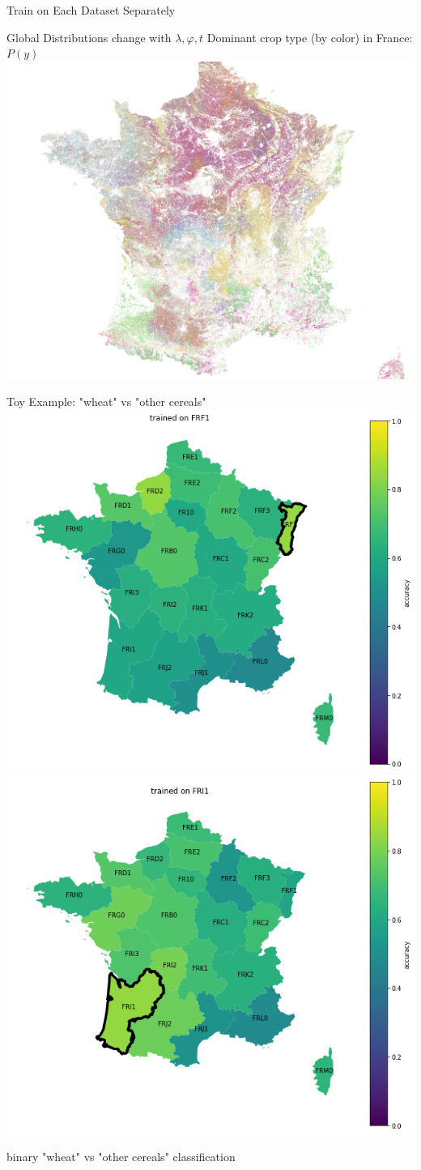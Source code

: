 \documentclass[11pt]{beamer}
\begin{document}
	\begin{frame}{Train on Each Dataset Separately}
		
	\end{frame}

	\begin{frame}{Global Distributions change with $\lambda, \varphi, t$}
		Dominant crop type (by color) in France: $P(y)$
		\includegraphics[width=\textwidth]{images/france_crop_distribution}
	\end{frame}


	\begin{frame}{Toy Example: "wheat" vs "other cereals"}
		\includegraphics[width=.49\textwidth]{images/francecrops/frf1.png}
		\includegraphics[width=.49\textwidth]{images/francecrops/fri1.png}
		
		\vspace{1em}
		binary "wheat" vs "other cereals" classification
	\end{frame}
\end{document}
